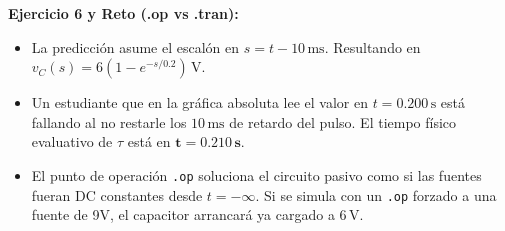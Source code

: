 \documentclass[11pt, a4paper]{article}
\begin{document}
\textbf{Ejercicio 6 y Reto (.op vs .tran):}
\begin{itemize}\setlength\itemsep{0em}
    \item La predicción asume el escalón en $s = t - 10\,\text{ms}$. Resultando en $v_C(s) = 6(1 - e^{-s/0.2})\,\text{V}$.
    \item Un estudiante que en la gráfica absoluta lee el valor en $t=0.200\,\text{s}$ está fallando al no restarle los $10\,\text{ms}$ de retardo del pulso. El tiempo físico evaluativo de $\tau$ está en $\mathbf{t = 0.210\,\text{s}}$.
    \item El punto de operación \texttt{.op} soluciona el circuito pasivo como si las fuentes fueran DC constantes desde $t = -\infty$. Si se simula con un \texttt{.op} forzado a una fuente de 9V, el capacitor arrancará ya cargado a $6\,\text{V}$.
\end{itemize}
\end{document}
